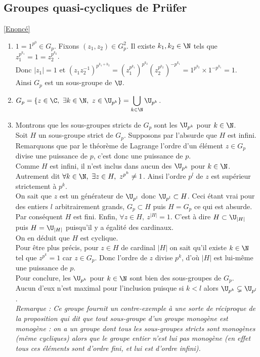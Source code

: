 \documentclass[8pt]{book}
\begin{document}
	\subsection{Groupes quasi-cycliques de Prüfer }
	\label{Groupes quasi-cycliques de Prüfer corrigé}
	\textcolor{blue}{\hyperref[Groupes quasi-cycliques de Prüfer]{[Enoncé]}}\\
	\begin{enumerate}[leftmargin=*]
		\item $1=1^{p^0}\in G_p$. Fixons $(z_1,z_2)\in G_p^2$. Il existe $k_1,k_2\in \N$ tels que $z_1^{p^{k_1}}=1=z_2^{p^{k_2}}$.\\
		Donc $|z_1|=1$ et $\left(z_1z_2^{-1}\right)^{p^{k_1+k_2}}=\left(z_1^{p^{k_1}}\right)^{p^{k_2}}\left(z_2^{p^{k_2}}\right)^{-p^{k_1}}=1^{p^{k_2}}\times 1^{-p^{k_1}}=1$.\\
		Ainsi $G_p$ est un sous-groupe de $\U$.
		\item $G_p=\{z\in \C,\ \exists k\in \N,\ z\in \U_{p^k}\}=\displaystyle\bigcup\limits_{k\in \N}\U_{p^k}$.
		\item Montrons que les sous-groupes stricts de $G_p$ sont les $\U_{p^k}$ pour $k\in \N$.\\
		Soit $H$ un sous-groupe strict de $G_p$. Supposons par l'absurde que $H$ est infini.\\
		Remarquons que par le théorème de Lagrange l'ordre d'un élément $z\in G_p$ divise une puissance de $p$, c'est donc une puissance de $p$.\\
		Comme $H$ est infini, il n'est inclus dans aucun des $\U_{p^k}$ pour $k\in \N$. Autrement dit $\forall k\in \N,\ \exists z\in H,\ z^{p^k}\ne 1$. Ainsi l'ordre $p^l$ de $z$ est supérieur strictement à $p^k$.\\
		On sait que $z$ est un générateur de $\U_{p^l}$ donc $\U_{p^l}\subset H$. Ceci étant vrai pour des entiers $l$ arbitrairement grands, $G_p\subset H$ puis $H=G_p$ ce qui est absurde.\\
		Par conséquent $H$ est fini.
		Enfin, $\forall z\in H,\ z^{|H|}=1$. C'est à dire $H\subset \U_{|H|}$ puis $H=\U_{|H|}$ puisqu'il y a égalité des cardinaux.\\
		On en déduit que $H$ est cyclique.\\
		Pour être plus précis, pour $z\in H$ de cardinal $|H|$ on sait qu'il existe $k\in \N$ tel que $z^{p^k}=1$ car $z\in G_p$. Donc l'ordre de $z$ divise $p^k$, d'où $|H|$ est lui-même une puissance de $p$.\\
		Pour conclure, les $\U_{p^k}$ pour $k\in \N$ sont bien des sous-groupes de $G_p$.\\
		Aucun d'eux n'est maximal pour l'inclusion puisque si $k<l$ alors $\U_{p^k}\subsetneq \U_{p^l}$.\\
		\textit{Remarque : Ce groupe fournit un contre-exemple à une sorte de réciproque de la proposition qui dit que tout sous-groupe d'un groupe monogène est monogène : on a un groupe dont tous les sous-groupes stricts sont monogènes (même cycliques) alors que le groupe entier n'est lui pas monogène (en effet tous ces éléments sont d'ordre fini, et lui est d'ordre infini).}
	\end{enumerate}
	
\end{document}
